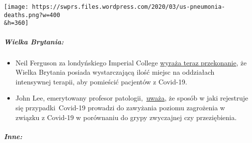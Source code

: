 \texttt{[image: https://swprs.files.wordpress.com/2020/03/us-pneumonia-deaths.png?w=400\\\&h=360]}

\hypertarget{wielka-brytania-1}{%
\subparagraph{\texorpdfstring{\textbf{Wielka
Brytania:}}{Wielka Brytania:}}\label{wielka-brytania-1}}

\begin{itemize}
\tightlist
\item
  Neil Ferguson za londyńskiego Imperial College
  \href{https://www.newscientist.com/article/2238578-uk-has-enough-intensive-care-units-for-coronavirus-expert-predicts/}{wyraża
  teraz przekonanie}, że Wielka Brytania posiada wystarczającą ilość
  miejsc na oddziałach intensywnej terapii, aby pomieścić pacjentów z
  Covid-19.
\item
  John Lee, emerytowany profesor
  patologii,~\href{https://www.spectator.co.uk/article/The-evidence-on-Covid-19-is-not-as-clear-as-we-think}{uważa},
  że sposób w jaki rejestruje się przypadki~Covid-19 prowadzi do
  zawyżania poziomu zagrożenia w związku z Covid-19 w porównaniu do
  grypy zwyczajnej czy przeziębienia.
\end{itemize}

\hypertarget{inne}{%
\subparagraph{\texorpdfstring{\textbf{Inne:}}{Inne:}}\label{inne}}


